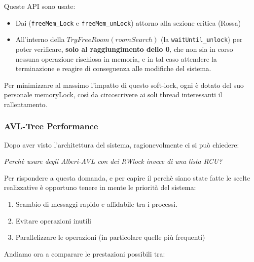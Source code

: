Queste API sono usate:
\begin{itemize}
\item
Dai \Reader (\verb|freeMem_Lock| e \verb|freeMem_unLock|) attorno alla sezione critica ({\color{red}Rossa})

\item
All'interno della {\color{blue}$TryFreeRoom(roomSearch)$} (la \verb|waitUntil_unlock|) per poter verificare,
\textbf{solo al raggiungimento dello 0}, che non sia in corso nessuna operazione rischiosa in memoria, e in tal caso
attendere la terminazione e reagire di conseguenza alle modifiche del sistema.
\end{itemize}

Per minimizzare al massimo l'impatto di questo soft-lock, ogni \Topic è dotato del suo personale memoryLock, così da
circoscrivere ai soli thread interessanti il rallentamento.


\subsubsection{AVL-Tree Performance} \label{treePerf}
Dopo aver visto l'architettura del sistema, ragionevolmente ci si può chiedere:

\begin{center}
\textit{Perchè usare degli Alberi-AVL con dei RWlock invece di una lista RCU?}
\end{center}

Per rispondere a questa domanda, e per capire il perchè siano state fatte le scelte realizzative è opportuno tenere in
mente le priorità del sistema:

\begin{enumerate}
 \item Scambio di messaggi rapido e affidabile tra i processi.
 \item Evitare operazioni inutili
 \item Parallelizzare le operazioni (in particolare quelle più frequenti)
\end{enumerate}

Andiamo ora a comparare le prestazioni possibili tra:


